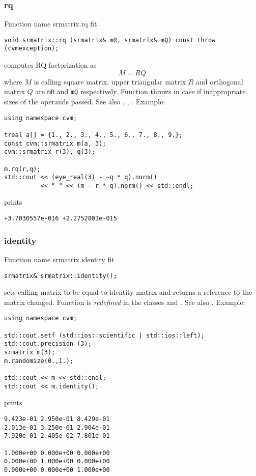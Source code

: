 \subsubsection{rq}
Function%
\pdfdest name {srmatrix.rq} fit
\begin{verbatim}
void srmatrix::rq (srmatrix& mR, srmatrix& mQ) const throw (cvmexception);
\end{verbatim}
computes RQ factorization as
\begin{equation*}
M=RQ
\end{equation*}
where 
$M$ is  calling square matrix, upper triangular matrix $R$ 
and orthogonal matrix $Q$ are \verb"mR" and \verb"mQ"
respectively. 
Function throws
in case if inappropriate sizes of the operands passed.
See also , ,
.
Example:
\begin{Verbatim}
using namespace cvm;

treal a[] = {1., 2., 3., 4., 5., 6., 7., 8., 9.};
const cvm::srmatrix m(a, 3);
cvm::srmatrix r(3), q(3);

m.rq(r,q);
std::cout << (eye_real(3) - ~q * q).norm()
          << " " << (m - r * q).norm() << std::endl;
\end{Verbatim}
prints
\begin{Verbatim}
+3.7030557e-016 +2.2752801e-015
\end{Verbatim}
\newpage


\subsubsection{identity}
Function%
\pdfdest name {srmatrix.identity} fit
\begin{verbatim}
srmatrix& srmatrix::identity();
\end{verbatim}
sets  calling matrix to be equal to identity matrix
and returns a reference to
the matrix changed. 
Function is \emph{redefined} in the classes
 and
.
See also .
Example:
\begin{Verbatim}
using namespace cvm;

std::cout.setf (std::ios::scientific | std::ios::left); 
std::cout.precision (3);
srmatrix m(3);
m.randomize(0.,1.);

std::cout << m << std::endl;
std::cout << m.identity();
\end{Verbatim}
prints
\begin{Verbatim}
9.423e-01 2.950e-01 8.429e-01
2.013e-01 3.250e-01 2.904e-01
7.920e-01 2.405e-02 7.801e-01

1.000e+00 0.000e+00 0.000e+00
0.000e+00 1.000e+00 0.000e+00
0.000e+00 0.000e+00 1.000e+00
\end{Verbatim}
\newpage




